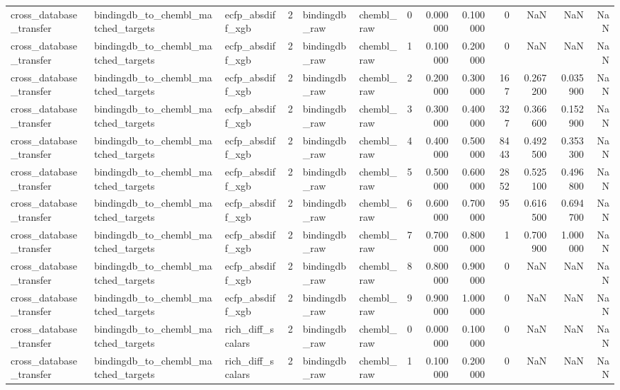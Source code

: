 \begin{longtable}{lllrllrrrrrrr}
cross\_database\_transfer & bindingdb\_to\_chembl\_matched\_targets & ecfp\_absdiff\_xgb & 2 & bindingdb\_raw & chembl\_raw & 0 & 0.000000 & 0.100000 & 0 & NaN & NaN & NaN \\
cross\_database\_transfer & bindingdb\_to\_chembl\_matched\_targets & ecfp\_absdiff\_xgb & 2 & bindingdb\_raw & chembl\_raw & 1 & 0.100000 & 0.200000 & 0 & NaN & NaN & NaN \\
cross\_database\_transfer & bindingdb\_to\_chembl\_matched\_targets & ecfp\_absdiff\_xgb & 2 & bindingdb\_raw & chembl\_raw & 2 & 0.200000 & 0.300000 & 167 & 0.267200 & 0.035900 & NaN \\
cross\_database\_transfer & bindingdb\_to\_chembl\_matched\_targets & ecfp\_absdiff\_xgb & 2 & bindingdb\_raw & chembl\_raw & 3 & 0.300000 & 0.400000 & 327 & 0.366600 & 0.152900 & NaN \\
cross\_database\_transfer & bindingdb\_to\_chembl\_matched\_targets & ecfp\_absdiff\_xgb & 2 & bindingdb\_raw & chembl\_raw & 4 & 0.400000 & 0.500000 & 8443 & 0.492500 & 0.353300 & NaN \\
cross\_database\_transfer & bindingdb\_to\_chembl\_matched\_targets & ecfp\_absdiff\_xgb & 2 & bindingdb\_raw & chembl\_raw & 5 & 0.500000 & 0.600000 & 2852 & 0.525100 & 0.496800 & NaN \\
cross\_database\_transfer & bindingdb\_to\_chembl\_matched\_targets & ecfp\_absdiff\_xgb & 2 & bindingdb\_raw & chembl\_raw & 6 & 0.600000 & 0.700000 & 95 & 0.616500 & 0.694700 & NaN \\
cross\_database\_transfer & bindingdb\_to\_chembl\_matched\_targets & ecfp\_absdiff\_xgb & 2 & bindingdb\_raw & chembl\_raw & 7 & 0.700000 & 0.800000 & 1 & 0.700900 & 1.000000 & NaN \\
cross\_database\_transfer & bindingdb\_to\_chembl\_matched\_targets & ecfp\_absdiff\_xgb & 2 & bindingdb\_raw & chembl\_raw & 8 & 0.800000 & 0.900000 & 0 & NaN & NaN & NaN \\
cross\_database\_transfer & bindingdb\_to\_chembl\_matched\_targets & ecfp\_absdiff\_xgb & 2 & bindingdb\_raw & chembl\_raw & 9 & 0.900000 & 1.000000 & 0 & NaN & NaN & NaN \\
cross\_database\_transfer & bindingdb\_to\_chembl\_matched\_targets & rich\_diff\_scalars & 2 & bindingdb\_raw & chembl\_raw & 0 & 0.000000 & 0.100000 & 0 & NaN & NaN & NaN \\
cross\_database\_transfer & bindingdb\_to\_chembl\_matched\_targets & rich\_diff\_scalars & 2 & bindingdb\_raw & chembl\_raw & 1 & 0.100000 & 0.200000 & 0 & NaN & NaN & NaN \\

\end{longtable}
